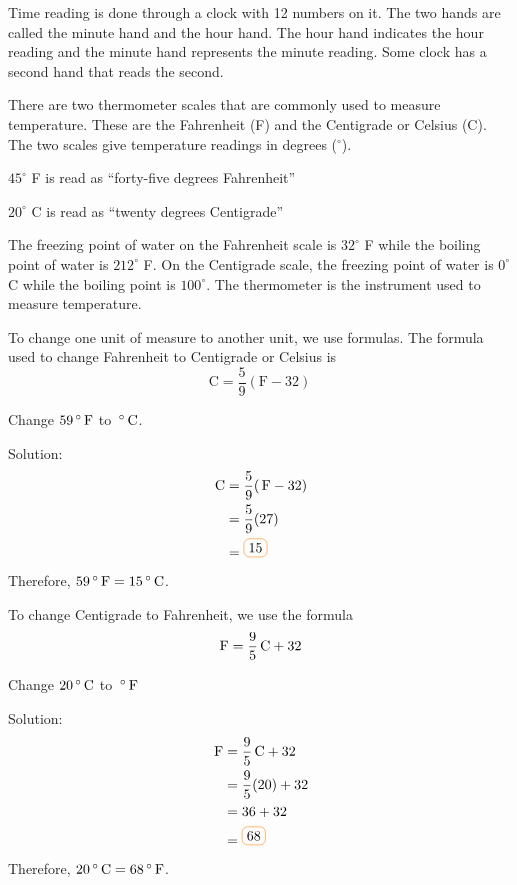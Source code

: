 Time reading is done through a clock with 12 numbers on it. The two hands are
called the minute hand and the hour hand. The hour hand indicates the hour reading and
the minute hand represents the minute reading. Some clock has a second hand that reads
the second.

There are two thermometer scales that are commonly used to measure temperature.
These are the Fahrenheit (F) and the Centigrade or Celsius (C). The two scales give
temperature readings in degrees ($^{\circ}$).

\begin{example}
\item $45^{\circ}$ F is read as “forty-five degrees Fahrenheit”
\item $20^{\circ}$ C is read as “twenty degrees Centigrade”
\end{example}

The freezing point of water on the Fahrenheit scale is $32^{\circ}$ F while the boiling point of
water is $212^{\circ}$ F. On the Centigrade scale, the freezing point of water is $0^{\circ}$ C while the boiling
point is $100^{\circ}$. The thermometer is the instrument used to measure temperature.

To change one unit of measure to another unit, we use formulas. The formula used
to change Fahrenheit to Centigrade or Celsius is
\begin{equation}
\mathrm{C}=\frac{5}{9}(\mathrm{F}-32)
\end{equation}
\begin{example}
\item Change $59\,\mathrm{^{\circ}}\,\mathrm{F}$ to $\,\mathrm{^{\circ}}\,\mathrm{C}$.

Solution:
\begin{align*}
\C&=\frac{5}{9}(\F-32)\\
&=\frac{5}{9}(27)\\
&=\boxed{15}
\end{align*}
Therefore, $59\,\mathrm{^{\circ}}\,\mathrm{F}=15\,\mathrm{^{\circ}}\,\mathrm{C}$.
\end{example}
To change Centigrade to Fahrenheit, we use the formula
\begin{equation}
\,\mathrm{F}=\frac{9}{5}\,\mathrm{C}+32
\end{equation}
\begin{example}
\item Change $20\,\mathrm{^{\circ}}\,\mathrm{C}$ to $\,\mathrm{^{\circ}}\,\mathrm{F}$

Solution: 
\begin{align*}
\F&=\frac{9}{5}\C+32\\
&=\frac{9}{5}(20)+32\\
&=36+32\\
&=\boxed{68}
\end{align*}
Therefore, $20\,\mathrm{^{\circ}}\,\mathrm{C}=68\,\mathrm{^{\circ}}\,\mathrm{F}$.
\end{example}
